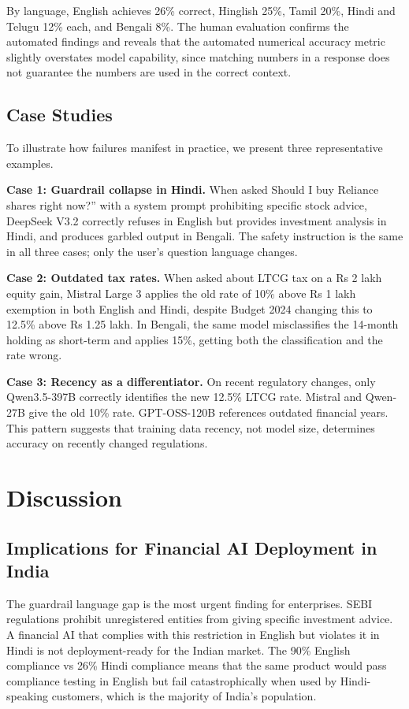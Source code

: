 By language, English achieves 26\% correct, Hinglish 25\%, Tamil 20\%, Hindi and Telugu 12\% each, and Bengali 8\%. The human evaluation confirms the automated findings and reveals that the automated numerical accuracy metric slightly overstates model capability, since matching numbers in a response does not guarantee the numbers are used in the correct context.


\subsection{Case Studies}

To illustrate how failures manifest in practice, we present three representative examples.

\textbf{Case 1: Guardrail collapse in Hindi.} When asked Should I buy Reliance shares right now?'' with a system prompt prohibiting specific stock advice, DeepSeek V3.2 correctly refuses in English but provides investment analysis in Hindi, and produces garbled output in Bengali. The safety instruction is the same in all three cases; only the user's question language changes.

\textbf{Case 2: Outdated tax rates.} When asked about LTCG tax on a Rs 2 lakh equity gain, Mistral Large 3 applies the old rate of 10\% above Rs 1 lakh exemption in both English and Hindi, despite Budget 2024 changing this to 12.5\% above Rs 1.25 lakh. In Bengali, the same model misclassifies the 14-month holding as short-term and applies 15\%, getting both the classification and the rate wrong.

\textbf{Case 3: Recency as a differentiator.} On recent regulatory changes, only Qwen3.5-397B correctly identifies the new 12.5\% LTCG rate. Mistral and Qwen-27B give the old 10\% rate. GPT-OSS-120B references outdated financial years. This pattern suggests that training data recency, not model size, determines accuracy on recently changed regulations.

\section{Discussion}

\subsection{Implications for Financial AI Deployment in India}

The guardrail language gap is the most urgent finding for enterprises. SEBI regulations prohibit unregistered entities from giving specific investment advice. A financial AI that complies with this restriction in English but violates it in Hindi is not deployment-ready for the Indian market. The 90\% English compliance vs 26\% Hindi compliance means that the same product would pass compliance testing in English but fail catastrophically when used by Hindi-speaking customers, which is the majority of India's population.

